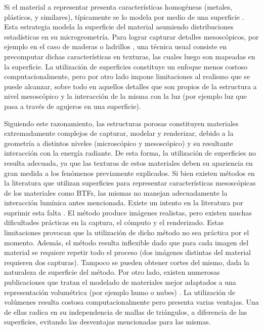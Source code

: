 Si el material a representar presenta características homogéneas (metales, plásticos, y similares), típicamente se lo modela por medio de una superficie \cite{Neumann1999}.
Esta estrategia modela la superficie del material asumiendo distribuciones estadísticas en su microgeometría.
Para lograr capturar detalles mesoscópicos, por ejemplo en el caso de maderas o ladrillos \cite{Lefebvre2000}, una técnica usual consiste en precomputar dichas características en texturas, las cuales luego son mapeadas en la superficie.
La utilización de superficies constituye un enfoque menos costoso computacionalmente, pero por otro lado impone limitaciones al realismo que se puede alcanzar, sobre todo en aquellos detalles que son propios de la estructura a nivel mesoscópico y la interacción de la misma con la luz (por ejemplo luz que pasa a través de agujeros en una superficie).

Siguiendo este razonamiento, las estructuras porosas constituyen materiales extremadamente complejos de capturar, modelar y renderizar, debido a la geometría a distintos niveles (microscópico y mesoscópico) y su resultante interacción con la energía radiante.
De esta forma, la utilización de superficies no resulta adecuada, ya que las texturas de estos materiales deben su apariencia en gran medida a los fenómenos previamente explicados.
Si bien existen métodos en la literatura que utilizan superficies para representar características mesoscópicas de los materiales como BTFs, las mismas no manejan adecuadamente la interacción lumínica antes mencionada.
Existe un intento en la literatura por suprimir esta falta \cite{Tong2005}.
El método produce imágenes realistas, pero existen muchas dificultades prácticas en la captura, el cómputo y el renderizado.
Estas limitaciones provocan que la utilización de dicho método no sea práctica por el momento.
Además, el método resulta inflexible dado que para cada imagen del material se requiere repetir todo el proceso (dos imágenes distintas del material requieren dos capturas).
Tampoco se pueden obtener cortes del mismo, dada la naturaleza de superficie del método.
Por otro lado, existen numerosas publicaciones que tratan el modelado de materiales mejor adaptados a una representación volumétrica (por ejemplo humo o nubes) \cite{Chentanez2011,Zhou2008}.
La utilización de volúmenes resulta costosa computacionalmente pero presenta varias ventajas.
Una de ellas radica en su independencia de mallas de triángulos, a diferencia de las superficies, evitando las desventajas mencionadas para las mismas.

